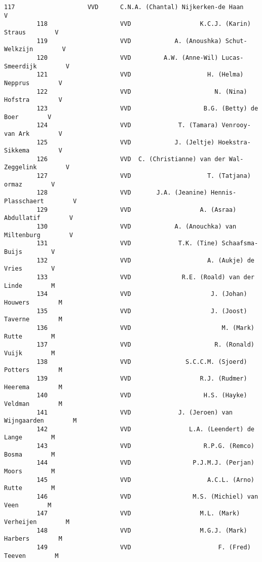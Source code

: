 \documentclass{article}
\begin{document}
\begin{Verbatim}[commandchars=\\\{\}]
         117                    VVD      C.N.A. (Chantal) Nijkerken-de Haan        V   
         118                    VVD                   K.C.J. (Karin) Straus        V   
         119                    VVD            A. (Anoushka) Schut-Welkzijn        V   
         120                    VVD         A.W. (Anne-Wil) Lucas-Smeerdijk        V   
         121                    VVD                     H. (Helma) Nepprus        V   
         122                    VVD                       N. (Nina) Hofstra        V   
         123                    VVD                    B.G. (Betty) de Boer        V   
         124                    VVD             T. (Tamara) Venrooy-van Ark        V   
         125                    VVD            J. (Jeltje) Hoekstra-Sikkema        V   
         126                    VVD  C. (Christianne) van der Wal-Zeggelink        V   
         127                    VVD                     T. (Tatjana) ormaz        V   
         128                    VVD       J.A. (Jeanine) Hennis-Plasschaert        V   
         129                    VVD                   A. (Asraa) Abdullatif        V   
         130                    VVD            A. (Anouchka) van Miltenburg        V   
         131                    VVD             T.K. (Tine) Schaafsma-Buijs        V   
         132                    VVD                     A. (Aukje) de Vries        V   
         133                    VVD              R.E. (Roald) van der Linde        M   
         134                    VVD                      J. (Johan) Houwers        M   
         135                    VVD                      J. (Joost) Taverne        M   
         136                    VVD                         M. (Mark) Rutte        M   
         137                    VVD                       R. (Ronald) Vuijk        M   
         138                    VVD               S.C.C.M. (Sjoerd) Potters        M   
         139                    VVD                   R.J. (Rudmer) Heerema        M   
         140                    VVD                    H.S. (Hayke) Veldman        M   
         141                    VVD             J. (Jeroen) van Wijngaarden        M   
         142                    VVD                L.A. (Leendert) de Lange        M   
         143                    VVD                    R.P.G. (Remco) Bosma        M   
         144                    VVD                 P.J.M.J. (Perjan) Moors        M   
         145                    VVD                     A.C.L. (Arno) Rutte        M   
         146                    VVD                 M.S. (Michiel) van Veen        M   
         147                    VVD                   M.L. (Mark) Verheijen        M   
         148                    VVD                   M.G.J. (Mark) Harbers        M   
         149                    VVD                        F. (Fred) Teeven        M   
         

\end{Verbatim}
\end{document}
